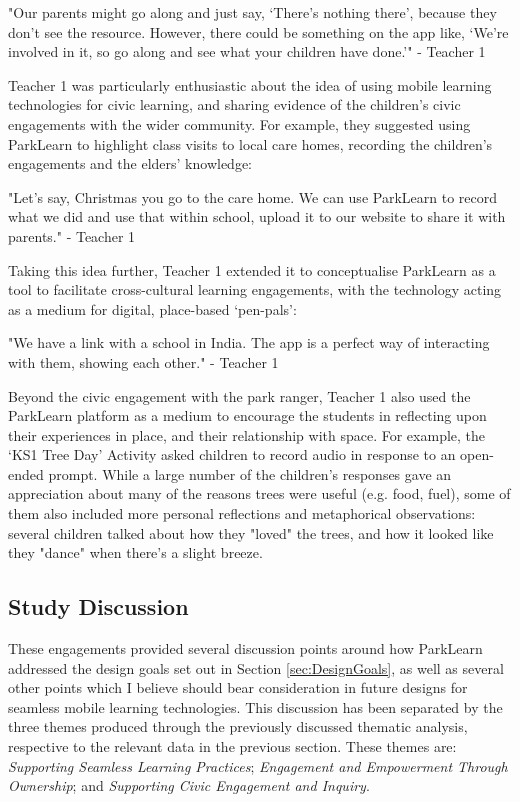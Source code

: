 \begin{displayquote}
"Our parents might go along and just say, `There's nothing there', because they don’t see the resource. However, there could be something on the app like, `We're involved in it, so go along and see what your children have done.'" - Teacher 1
\end{displayquote}

Teacher 1 was particularly enthusiastic about the idea of using mobile learning technologies for civic learning, and sharing evidence of the children's civic engagements with the wider community. For example, they suggested using ParkLearn to highlight class visits to local care homes, recording the children's engagements and the elders' knowledge: 

\begin{displayquote}
"Let’s say, Christmas you go to the care home. We can use ParkLearn to record what we did and use that within school, upload it to our website to share it with parents." - Teacher 1
\end{displayquote}

Taking this idea further, Teacher 1 extended it to conceptualise ParkLearn as a tool to facilitate cross-cultural learning engagements, with the technology acting as a medium for digital, place-based `pen-pals': 

\begin{displayquote}
"We have a link with a school in India. The app is a perfect way of interacting with them, showing each other." - Teacher 1
\end{displayquote}

Beyond the civic engagement with the park ranger, Teacher 1 also used the ParkLearn platform as a medium to encourage the students in reflecting upon their experiences in place, and their relationship with space. For example, the `KS1 Tree Day' Activity asked children to record audio in response to an open-ended prompt. While a large number of the children's responses gave an appreciation about many of the reasons trees were useful (e.g. food, fuel), some of them also included more personal reflections and metaphorical observations: several children talked about how they "loved" the trees, and how it looked like they "dance" when there's a slight breeze.

\subsection{Study Discussion}
\label{sec:TeacherDiscussion}
These engagements provided several discussion points around how ParkLearn addressed the design goals set out in Section \ref{sec:DesignGoals}, as well as several other points which I believe should bear consideration in future designs for seamless mobile learning technologies. This discussion has been separated by the three themes produced through the previously discussed thematic analysis, respective to the relevant data in the previous section. These themes are: \textit{Supporting Seamless Learning Practices}; \textit{Engagement and Empowerment Through Ownership}; and \textit{Supporting Civic Engagement and Inquiry}.

